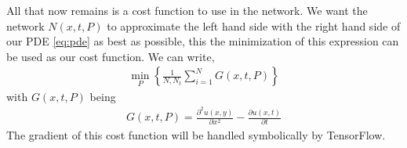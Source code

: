 All that now remains is a cost function to use in the network. We want the network $N(x,t,P)$ to approximate the left hand side with the right hand side of our PDE \eqref{eq:pde} as best as possible\cite[p. 5]{hein-odenn}, this the minimization of this expression can be used as our cost function. We can write,
\begin{align}
    \underset{P}{\min} \left\{\frac{1}{N,N_t} \sum^N_{i=1} G(x,t,P) \right\}
    \label{eq:pde-cost-function}
\end{align}
with $G(x,t,P)$ being
\begin{align}
    G(x, t, P) = \frac{\partial^2 u(x,y)}{\partial x^2} - \frac{\partial u(x,t)}{\partial t} 
\end{align}
The gradient of this cost function will be handled symbolically by TensorFlow\cite{tensorflow2015-whitepaper}.


